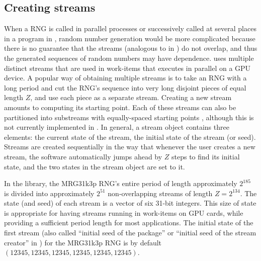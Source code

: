 \documentclass[article,nojss]{jss}\usepackage[]{graphicx}\usepackage[]{color}
\begin{document}
\subsection{Creating streams}\label{createstreams}
When a RNG is called in parallel processes or successively called at several places in a program in , random number generation would be more complicated because there is no guarantee that the streams (analogous to  in ) do not overlap, and thus the generated sequences of random numbers may have dependence.  uses multiple distinct streams that are used in work-items that executes in parallel on a GPU device. A popular way of obtaining multiple streams is to take an RNG with a long period and cut the RNG's sequence into very long disjoint pieces of equal length $Z$, and use each piece as a separate stream. Creating a new stream amounts to computing its starting point. Each of these streams can also be partitioned into substreams with equally-spaced starting points \citep{l2002object, rLEC15a}, although this is not currently implemented in . In general, a stream object contains three elements: the current state of the stream, the initial state of the stream (or seed). Streams are created sequentially in the way that whenever the user creates a new stream, the software automatically jumps ahead by $Z$ steps to find its initial state, and the two states in the stream object are set to it. 


In the  library, the MRG31k3p RNG's entire period of length approximately $2^{185}$ is divided into approximately $2^{51}$ non-overlapping streams of length $Z = 2^{134}$. %
The state (and seed) of each stream is a vector of six 31-bit integers. This size of state is appropriate for having streams running in work-items on GPU cards, while providing a sufficient period length for most applications. The initial state of the first stream (also called ``initial seed of the package'' or ``initial seed of the stream creator'' in ) for the MRG31k3p RNG is by default $(12345, 12345, 12345, 12345, 12345, 12345)$. 
\end{document}
